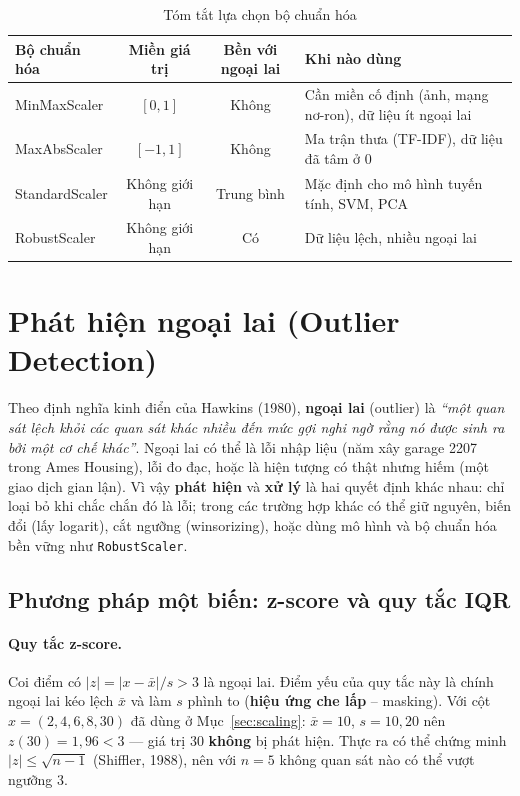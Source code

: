 \begin{table}[H]
\centering
\begin{tabular}{|l|c|c|p{5.2cm}|}
\hline
\textbf{Bộ chuẩn hóa} & \textbf{Miền giá trị} & \textbf{Bền với ngoại lai} & \textbf{Khi nào dùng} \\
\hline
MinMaxScaler & $[0, 1]$ & Không & Cần miền cố định (ảnh, mạng nơ-ron), dữ liệu ít ngoại lai \\ \hline
MaxAbsScaler & $[-1, 1]$ & Không & Ma trận thưa (TF-IDF), dữ liệu đã tâm ở 0 \\ \hline
StandardScaler & Không giới hạn & Trung bình & Mặc định cho mô hình tuyến tính, SVM, PCA \\ \hline
RobustScaler & Không giới hạn & Có & Dữ liệu lệch, nhiều ngoại lai \\ \hline
\end{tabular}
\caption{Tóm tắt lựa chọn bộ chuẩn hóa}
\end{table}

\section{Phát hiện ngoại lai (Outlier Detection)}
\label{sec:outlier}

Theo định nghĩa kinh điển của Hawkins (1980), \textbf{ngoại lai} (outlier) là \textit{``một quan sát lệch khỏi các quan sát khác nhiều đến mức gợi nghi ngờ rằng nó được sinh ra bởi một cơ chế khác''}. Ngoại lai có thể là lỗi nhập liệu (năm xây garage 2207 trong Ames Housing), lỗi đo đạc, hoặc là hiện tượng có thật nhưng hiếm (một giao dịch gian lận). Vì vậy \textbf{phát hiện} và \textbf{xử lý} là hai quyết định khác nhau: chỉ loại bỏ khi chắc chắn đó là lỗi; trong các trường hợp khác có thể giữ nguyên, biến đổi (lấy logarit), cắt ngưỡng (winsorizing), hoặc dùng mô hình và bộ chuẩn hóa bền vững như \texttt{RobustScaler}.

\subsection{Phương pháp một biến: z-score và quy tắc IQR}

\paragraph{Quy tắc z-score.} Coi điểm có $|z| = |x - \bar{x}|/s > 3$ là ngoại lai. Điểm yếu của quy tắc này là chính ngoại lai kéo lệch $\bar{x}$ và làm $s$ phình to (\textbf{hiệu ứng che lấp} -- masking). Với cột $x = (2, 4, 6, 8, 30)$ đã dùng ở Mục~\ref{sec:scaling}: $\bar{x} = 10$, $s = 10{,}20$ nên $z(30) = 1{,}96 < 3$ --- giá trị 30 \textbf{không} bị phát hiện. Thực ra có thể chứng minh $|z| \leq \sqrt{n - 1}$ (Shiffler, 1988), nên với $n = 5$ không quan sát nào có thể vượt ngưỡng 3.

